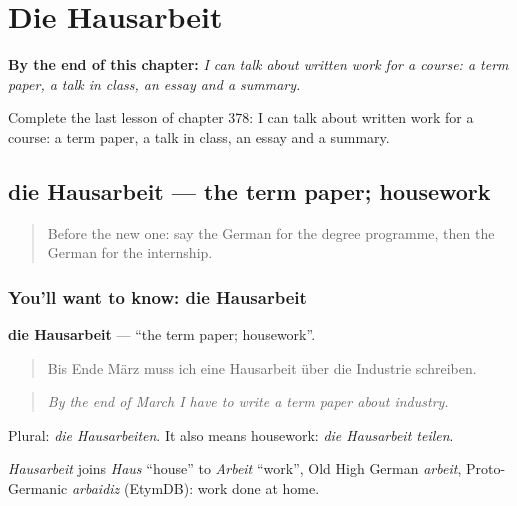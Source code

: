 
\chapter{Die Hausarbeit}
\label{ch:ge-die-hausarbeit}

\begin{chapteropening}
\textbf{By the end of this chapter:} \emph{I can talk about written work for a course: a term paper, a talk in class, an essay and a summary.}

Complete the last lesson of chapter 378: I can talk about written work for a course: a term paper, a talk in class, an essay and a summary.
\end{chapteropening}

\section[die Hausarbeit]{die Hausarbeit — the term paper; housework}

\label{lesson:GE-C378-hausarbeit}



\begin{quote}
Before the new one: say the German for the degree programme, then the German for the internship.
\end{quote}

\subsection*{You'll want to know: die Hausarbeit}
\textbf{die Hausarbeit} — \textquotedblleft{}the term paper; housework\textquotedblright{}.

\begin{quote}
Bis Ende März muss ich eine Hausarbeit über die Industrie schreiben.
\end{quote}

\begin{quote}
\emph{By the end of March I have to write a term paper about industry.}
\end{quote}

Plural: \emph{die Hausarbeiten}. It also means housework: \emph{die Hausarbeit teilen}.

\begin{cousinweb}
\emph{Hausarbeit} joins \emph{Haus} \textquotedblleft{}house\textquotedblright{} to \emph{Arbeit} \textquotedblleft{}work\textquotedblright{}, Old High German \emph{arbeit}, Proto-Germanic \emph{arbaidiz} (EtymDB): work done at home.
\end{cousinweb}

